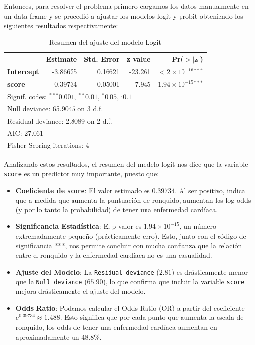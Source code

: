 Entonces, para resolver el problema primero cargamos los datos manualmente en un data frame y se procedió a ajustar los modelos logit y probit obteniendo los siguientes resultados respectivamente:

\begin{table}[H]
\centering
\caption{Resumen del ajuste del modelo Logit}
\label{tab:logit_summary}
\begin{tabular}{lrrrr}
\hline
 & \textbf{Estimate} & \textbf{Std. Error} & \textbf{z value} & \textbf{Pr($\mathbf{>|z|}$)} \\
\hline
\textbf{Intercept} & -3.86625 & 0.16621 & -23.261 & $<2 \times 10^{-16}$$^{***}$ \\
\textbf{score}     & 0.39734  & 0.05001 & 7.945   & $1.94 \times 10^{-15}$$^{***}$ \\
\hline
\multicolumn{5}{l}{\footnotesize Signif. codes: $^{***}0.001$, $^{**}0.01$, $^{*}0.05$, $^{.}0.1$} \\
\multicolumn{5}{l}{\footnotesize Null deviance: 65.9045 on 3 d.f.} \\
\multicolumn{5}{l}{\footnotesize Residual deviance: 2.8089 on 2 d.f.} \\
\multicolumn{5}{l}{\footnotesize AIC: 27.061} \\
\multicolumn{5}{l}{\footnotesize Fisher Scoring iterations: 4} \\
\end{tabular}
\end{table}

Analizando estos resultados, el resumen del modelo logit nos dice que la variable \texttt{score} es un predictor muy importante, puesto que: 

\begin{itemize}
    \item \textbf{Coeficiente de} \texttt{score}: El valor estimado es $0.39734$. Al ser positivo, indica que a medida que aumenta la puntuación de ronquido, aumentan los log-odds (y por lo tanto la probabilidad) de tener una enfermedad cardíaca.
    
    \item \textbf{Significancia Estadística}: El p-valor es $1.94 \times 10^{-15}$, un número extremadamente pequeño (prácticamente cero). Esto, junto con el código de significancia ***, nos permite concluir con mucha confianza que la relación entre el ronquido y la enfermedad cardíaca no es una casualidad.
    
    \item \textbf{Ajuste del Modelo}: La \texttt{Residual deviance} ($2.81$) es drásticamente menor que la \texttt{Null deviance} ($65.90$), lo que confirma que incluir la variable \texttt{score} mejora drásticamente el ajuste del modelo.

    \item \textbf{Odds Ratio}: Podemos calcular el Odds Ratio (OR) a partir del coeficiente $e^{0.39734} \approx 1.488$. Esto significa que por cada punto que aumenta la escala de ronquido, los odds de tener una enfermedad cardíaca aumentan en aproximadamente un $48.8\%$.
\end{itemize}


